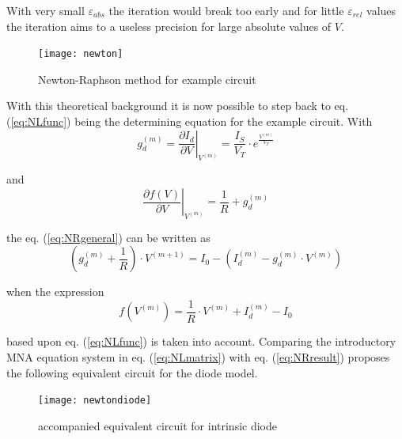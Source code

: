With very small $\varepsilon_{abs}$ the iteration would break too
early and for little $\varepsilon_{rel}$ values the iteration aims to
a useless precision for large absolute values of $V$.

\begin{figure}[ht]
\begin{center}
\texttt{[image: newton]}
\end{center}
\caption{Newton-Raphson method for example circuit}
\label{fig:NewtonRaphson}
\end{figure}
\FloatBarrier

With this theoretical background it is now possible to step back to
eq. (\ref{eq:NLfunc}) being the determining equation for the example
circuit.  With
\begin{equation}
g_{d}^{(m)} = \left.\dfrac{\partial I_{d}}{\partial V}\right|_{V^{(m)}} = \dfrac{I_{S}}{V_{T}}\cdot e^{\frac{V^{(m)}}{V_{T}}}
\end{equation}

and
\begin{equation}
\left.\dfrac{\partial f\left(V\right)}{\partial V}\right|_{V^{(m)}} = \dfrac{1}{R} + g_{d}^{(m)}
\end{equation}

the eq. (\ref{eq:NRgeneral}) can be written as
\begin{equation}
\left(g_{d}^{(m)} + \dfrac{1}{R}\right)\cdot V^{(m+1)} = I_{0} - \left(I_{d}^{(m)} - g_{d}^{(m)}\cdot V^{(m)}\right)
\label{eq:NRresult}
\end{equation}

when the expression
\begin{equation}
f\left(V^{(m)}\right) = \dfrac{1}{R}\cdot V^{(m)} + I_{d}^{(m)} - I_{0}
\end{equation}

based upon eq. (\ref{eq:NLfunc}) is taken into account.  Comparing the
introductory MNA equation system in eq. (\ref{eq:NLmatrix}) with
eq. (\ref{eq:NRresult}) proposes the following equivalent circuit for
the diode model.

\begin{figure}[ht]
\begin{center}
\texttt{[image: newtondiode]}
\end{center}
\caption{accompanied equivalent circuit for intrinsic diode}
\label{fig:AccompaniedModel}
\end{figure}
\FloatBarrier

